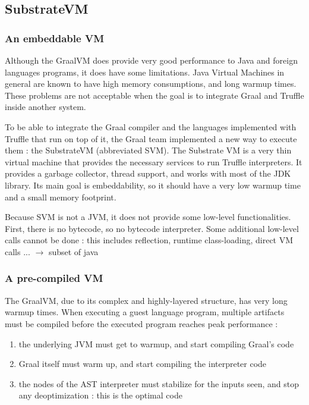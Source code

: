 \documentclass[twoside,11pt,a4paper]{article}
\begin{document}
\subsection{SubstrateVM}

\subsubsection{An embeddable VM}

Although the GraalVM does provide very good performance to Java and foreign languages programs, it does have some limitations. Java Virtual Machines in general are known to have high memory consumptions, and long warmup times. These problems are not acceptable when the goal is to integrate Graal and Truffle inside another system.

To be able to integrate the Graal compiler and the languages implemented with Truffle that run on top of it, the Graal team implemented a new way to execute them : the SubstrateVM (abbreviated SVM). The Substrate VM is a very thin virtual machine that provides the necessary services to run Truffle interpreters. It provides a garbage collector, thread support, and works with most of the JDK library. Its main goal is embeddability, so it should have a very low warmup time and a small memory footprint.

Because SVM is not a JVM, it does not provide some low-level functionalities. First, there is no bytecode, so no bytecode interpreter. Some additional low-level calls cannot be done : this includes reflection, runtime class-loading, direct VM calls ...
$\rightarrow$ subset of java

\subsubsection{A pre-compiled VM}

The GraalVM, due to its complex and highly-layered structure, has very long warmup times. When executing a guest language program, multiple artifacts must be compiled before the executed program reaches peak performance :
\begin{enumerate}
\item the underlying JVM must get to warmup, and start compiling Graal's code
\item Graal itself must warm up, and start compiling the interpreter code
\item the nodes of the AST interpreter must stabilize for the inputs seen, and stop any deoptimization : this is the optimal code
\end{enumerate}
\end{document}
